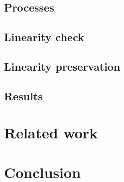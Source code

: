\documentclass{mproj}
\begin{document}
\section{Processes}\label{processes}

\section{Linearity check}\label{linearity-check}

\section{Linearity preservation}\label{linearity-preservation}

\section{Results}\label{results}

\chapter{Related work}\label{related-work}

\chapter{Conclusion}\label{conclusion}



\end{document}
